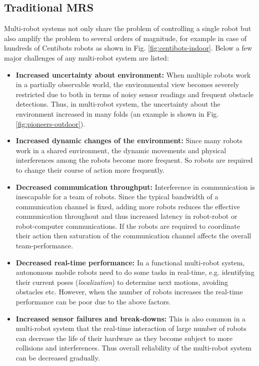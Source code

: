 \subsection{Traditional MRS}
\label{bg:mrs:mrs}
Multi-robot systems not only share the problem of controlling a single robot but also amplify the problem to several orders of magnitude, for example in case of hundreds of Centibots robots as shown in Fig. \ref{fig:centibots-indoor}. Below a few major challenges of any multi-robot system are listed:
\begin{itemize}
\item \textbf{Increased uncertainty about environment:}
When multiple robots work in a partially observable world, the environmental view becomes severely restricted due to both in terms of noisy sensor readings and frequent obstacle detections. Thus, in multi-robot system, the uncertainty about the environment increased in many folds (an example is shown in Fig. \ref{fig:pioneers-outdoor}).
%
\item \textbf{Increased dynamic changes of the environment:}
Since many robots work in a shared environment, the dynamic movements and physical interferences among the robots become more frequent. So robots are required to change their course of action more frequently.
% 
\item \textbf{Decreased communication throughput:}
Interference in communication is inescapable for a team of robots. Since the typical bandwidth of a communication channel is fixed, adding more robots reduces the effective communication throughout and thus increased latency in robot-robot or robot-computer communications. If the robots are required to coordinate their action then  saturation of the communication channel affects the overall team-performance.
%
\item \textbf{Decreased real-time performance:}
In a functional multi-robot system, autonomous mobile robots need to do some tasks in real-time, e.g. identifying their current poses ({\em localization}) to determine next motions, avoiding obstacles etc. However, when the number of robots increases the real-time performance can be poor due to the above factors.
%
\item \textbf{Increased sensor failures and break-downs:}
This is also common in a multi-robot system that the real-time interaction of large number of robots can decrease the life of their hardware as they become subject to more collisions and interferences. Thus overall reliability of the multi-robot system can be decreased gradually.
\end{itemize}
